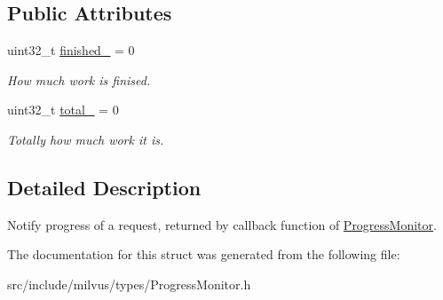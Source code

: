 \subsection*{Public Attributes}
\begin{DoxyCompactItemize}
\item 
\mbox{\label{structmilvus_1_1_progress_ab9d156bb65f7594a0bd00a3a3b858680}} 
uint32\+\_\+t \hyperlink{structmilvus_1_1_progress_ab9d156bb65f7594a0bd00a3a3b858680}{finished\+\_\+} = 0
\begin{DoxyCompactList}\small\item\em How much work is finised. \end{DoxyCompactList}\item 
\mbox{\label{structmilvus_1_1_progress_a091a9e8bfd2de0e132da7312a47b53cb}} 
uint32\+\_\+t \hyperlink{structmilvus_1_1_progress_a091a9e8bfd2de0e132da7312a47b53cb}{total\+\_\+} = 0
\begin{DoxyCompactList}\small\item\em Totally how much work it is. \end{DoxyCompactList}\end{DoxyCompactItemize}


\subsection{Detailed Description}
Notify progress of a request, returned by callback function of \hyperlink{classmilvus_1_1_progress_monitor}{Progress\+Monitor}. 

The documentation for this struct was generated from the following file\+:\begin{DoxyCompactItemize}
\item 
src/include/milvus/types/Progress\+Monitor.\+h\end{DoxyCompactItemize}
